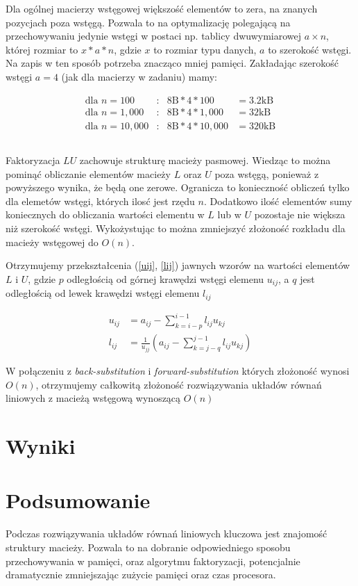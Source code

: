 \documentclass[11pt]{extarticle}
\begin{document}
	Dla ogólnej macierzy wstęgowej większość elementów to zera, na znanych pozycjach poza wstęgą.
	Pozwala to na optymalizację polegającą na przechowywaniu jedynie wstęgi w postaci np. tablicy dwuwymiarowej \(a\times n\),
	której rozmiar to \(x*a*n\), gdzie \(x\) to rozmiar typu danych, \(a\) to szerokość wstęgi.
	Na zapis w ten sposób potrzeba znacząco mniej pamięci. Zakładając szerokość wstęgi \(a=4\) (jak dla macierzy w zadaniu) mamy:

	\begin{align}
		\text{dla } n=100 &:& 8\text{B}*4*100 &= 3.2\text{kB} \\
		\text{dla } n=1,000 &:& 8\text{B}*4*1,000 &= 32\text{kB} \\
		\text{dla } n=10,000 &:& 8\text{B}*4*10,000 &= 320\text{kB}
	\end{align}

	\subsection{}

	Faktoryzacja \(LU\) zachowuje strukturę macieży pasmowej.
	Wiedząc to można pominąć obliczanie elementów macieży \(L\) oraz \(U\) poza wstęgą, ponieważ z powyższego wynika, że będą one zerowe.
	Ogranicza to konieczność obliczeń tylko dla elemetów wstęgi, których ilosć jest rzędu \(n\).	
	Dodatkowo ilość elementów sumy koniecznych do obliczania wartości elementu w \(L\) lub w \(U\) pozostaje nie większa niż szerokość wstęgi.
	Wykożystując to można zmniejszyć złożoność rozkładu dla macieży wstęgowej do \(O(n)\).
	
	Otrzymujemy przekształcenia (\ref{uij}, \ref{lij}) jawnych wzorów na wartości elementów \(L\) i \(U\),
	gdzie \(p\) odległością od górnej krawędzi wstęgi elemenu \(u_{ij}\), a \(q\) jest odległością od lewek krawędzi wstęgi elemenu \(l_{ij}\)

	\begin{align}
		\label{uij}
		u_{ij} &= a_{ij} - \sum_{k=i-p}^{i-1} l_{ij}u_{kj} \\
		\label{lij}
		l_{ij} &= \frac{1}{u_{jj}} \left( a_{ij} - \sum_{k=j-q}^{j-1} l_{ij}u_{kj} \right)
	\end{align}

	W połączeniu z \emph{back-substitution} i \emph{forward-substitution} których złożoność wynosi \(O(n)\),
	otrzymujemy całkowitą złożoność rozwiązywania układów równań liniowych z macieżą wstęgową wynoszącą \(O(n)\)


	\section{Wyniki}
	
	\section{Podsumowanie}

	Podczas rozwiązywania układów równań liniowych kluczowa jest znajomość struktury macieży.
	Pozwala to na dobranie odpowiedniego sposobu przechowywania w pamięci, oraz algorytmu faktoryzacji,
	potencjalnie dramatycznie zmniejszając zużycie pamięci oraz czas procesora.
\end{document}
